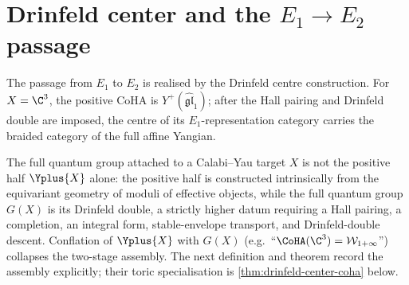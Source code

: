 \section{Drinfeld center and the \texorpdfstring{$E_1 \to E_2$}{E-1 -> E-2} passage}
\label{sec:drinfeld-center-yangian}

The passage from \(E_1\) to \(E_2\) is realised by the Drinfeld centre construction. For \(X=\C^3\), the positive CoHA is \(Y^+(\widehat{\mathfrak{gl}}_1)\); after the Hall pairing and Drinfeld double are imposed, the centre of its \(E_1\)-representation category carries the braided category of the full affine Yangian.

The full quantum group attached to a Calabi--Yau target $X$ is not the
positive half $\Yplus{X}$ alone: the positive half is constructed
intrinsically from the equivariant geometry of moduli of effective
objects, while the full quantum group $G(X)$ is its Drinfeld double, a
strictly higher datum requiring a Hall pairing, a completion, an
integral form, stable-envelope transport, and Drinfeld-double descent.
Conflation of $\Yplus{X}$ with $G(X)$ (e.g.\ ``$\CoHA(\C^3) =
\Wonepinf$'') collapses the two-stage assembly. The next definition and
theorem record the assembly explicitly; their toric specialisation is
\cref{thm:drinfeld-center-coha} below.

